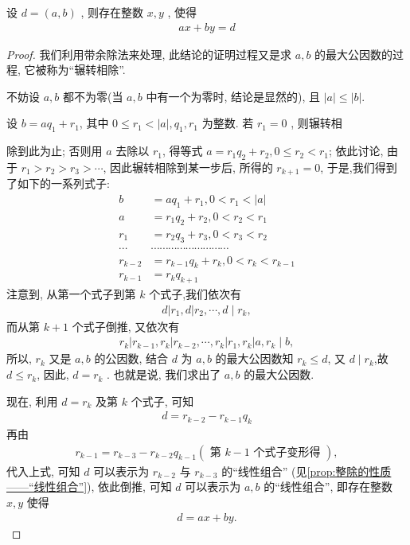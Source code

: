 \begin{property}[贝祖(Bezout)定理]
	设 $d=(a, b)$ , 则存在整数 $x ,  y$ , 使得
\begin{align*}
	a x+b y=d
\end{align*}
\end{property}
\begin{proof}
我们利用带余除法来处理, 此结论的证明过程又是求 $a ,  b$ 的最大公因数的过程, 它被称为“辗转相除”.

不妨设 $a ,  b$ 都不为零(当 $a ,  b$ 中有一个为零时, 结论是显然的), 且 $|a| \leqslant|b|$.

设 $b=a q_{1}+r_{1}$, 其中 $0 \leqslant r_{1}<|a|, q_{1} ,  r_{1}$ 为整数. 若 $r_{1}=0$ , 则辗转相

除到此为止; 否则用 $a$ 去除以 $r_{1}$, 得等式 $a=r_{1} q_{2}+r_{2}, 0 \leqslant r_{2}<r_{1}$; 依此讨论, 由于 $r_{1}>r_{2}>r_{3}>\cdots$, 因此辗转相除到某一步后, 所得的 $r_{k+1}=0$, 于是,我们得到了如下的一系列式子:
\begin{align*}
	b       & =a q_{1}+r_{1}, 0<r_{1}<|a|                                    \\
	a       & =r_{1} q_{2}+r_{2}, 0<r_{2}<r_{1}                              \\
	r_{1}   & =r_{2} q_{3}+r_{3}, 0<r_{3}<r_{2}                              \\
	\cdots  & \cdots \cdots \cdots \cdots \cdots \cdots \cdots \cdots \cdots \\
	r_{k-2} & =r_{k-1} q_{k}+r_{k}, 0<r_{k}<r_{k-1}                          \\
	r_{k-1} & =r_{k} q_{k+1}
\end{align*}
注意到, 从第一个式子到第 $k$ 个式子,我们依次有
\begin{align*}
	d\left|r_{1}, d\right| r_{2}, \cdots, d \mid r_{k},
\end{align*}
而从第 $k+1$ 个式子倒推, 又依次有
\begin{align*}
	r_{k}\left|r_{k-1}, r_{k}\right| r_{k-2}, \cdots, r_{k}\left|r_{1}, r_{k}\right| a, r_{k} \mid b,
\end{align*}
所以, $r_{k}$ 又是 $a ,  b$ 的公因数, 结合 $d$ 为 $a ,  b$ 的最大公因数知 $r_{k} \leqslant d$, 又 $d \mid r_{k}$,故 $d \leqslant r_{k}$, 因此, $d=r_{k}$ . 也就是说, 我们求出了 $a ,  b$ 的最大公因数.

现在, 利用 $d=r_{k}$ 及第 $k$ 个式子, 可知
\begin{align*}
	d=r_{k-2}-r_{k-1} q_{k}
\end{align*}
再由
\begin{align*}
	r_{k-1}=r_{k-3}-r_{k-2} q_{k-1}(\text { 第 } k-1 \text { 个式子变形得 }),
\end{align*}
代入上式, 可知 $d$ 可以表示为 $r_{k-2}$ 与 $r_{k-3}$ 的“线性组合” (见\autoref{prop:整除的性质——“线性组合”}), 依此倒推, 可知 $d$ 可以表示为 $a, b$ 的“线性组合”, 即存在整数 $x, y$ 使得
\begin{align*}
	d=a x+b y .
\end{align*}
\end{proof}
